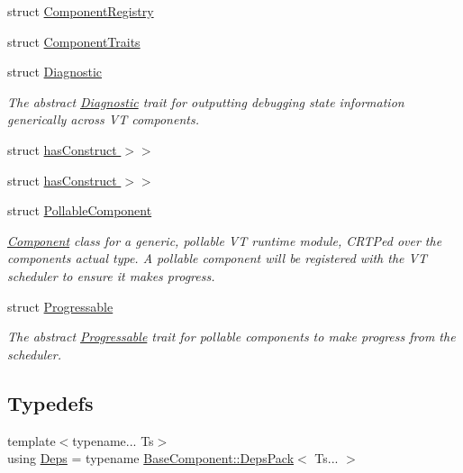 \begin{DoxyCompactItemize}
struct \hyperlink{structvt_1_1runtime_1_1component_1_1_component_registry}{Component\+Registry}
\item 
struct \hyperlink{structvt_1_1runtime_1_1component_1_1_component_traits}{Component\+Traits}
\item 
struct \hyperlink{structvt_1_1runtime_1_1component_1_1_diagnostic}{Diagnostic}
\begin{DoxyCompactList}\small\item\em The abstract {\ttfamily \hyperlink{structvt_1_1runtime_1_1component_1_1_diagnostic}{Diagnostic}} trait for outputting debugging state information generically across VT components. \end{DoxyCompactList}\item 
struct \hyperlink{structvt_1_1runtime_1_1component_1_1_component_constructor_3_01_t_00_01typename_01std_1_1enable_685c93152efe877e93b8cef50f7ce12a}{has\+Construct $>$$>$}
\item 
struct \hyperlink{structvt_1_1runtime_1_1component_1_1_component_constructor_3_01_t_00_01typename_01std_1_1enable_ba8f7403cb2e97bf6260fe78f92dad1c}{has\+Construct $>$$>$}
\item 
struct \hyperlink{structvt_1_1runtime_1_1component_1_1_pollable_component}{Pollable\+Component}
\begin{DoxyCompactList}\small\item\em {\ttfamily \hyperlink{structvt_1_1runtime_1_1component_1_1_component}{Component}} class for a generic, pollable VT runtime module, C\+R\+TP\textquotesingle{}ed over the component\textquotesingle{}s actual type. A pollable component will be registered with the VT scheduler to ensure it makes progress. \end{DoxyCompactList}\item 
struct \hyperlink{structvt_1_1runtime_1_1component_1_1_progressable}{Progressable}
\begin{DoxyCompactList}\small\item\em The abstract {\ttfamily \hyperlink{structvt_1_1runtime_1_1component_1_1_progressable}{Progressable}} trait for pollable components to make progress from the scheduler. \end{DoxyCompactList}\end{DoxyCompactItemize}
\subsection*{Typedefs}
\begin{DoxyCompactItemize}
\item 
{\footnotesize template$<$typename... Ts$>$ }\\using \hyperlink{namespacevt_1_1runtime_1_1component_afad3a7a92e35d9ab3d81540d9275213c}{Deps} = typename \hyperlink{structvt_1_1runtime_1_1component_1_1_base_component_1_1_deps_pack}{Base\+Component\+::\+Deps\+Pack}$<$ Ts... $>$
\end{DoxyCompactItemize}



